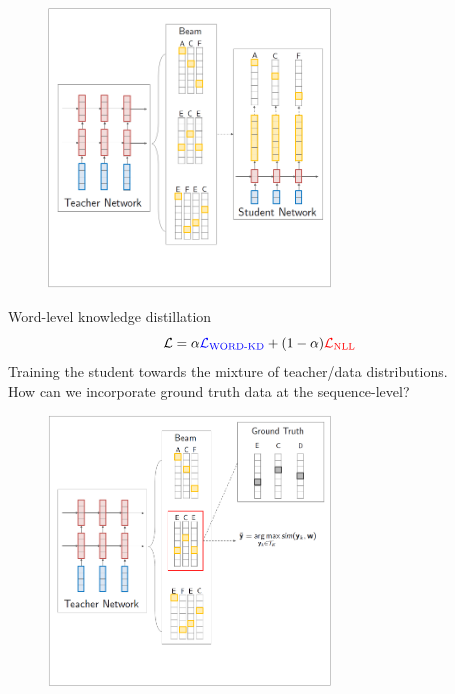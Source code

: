 \documentclass{beamer}
\newcommand{\air}{\vspace{0.25cm}}
\begin{document}
\begin{frame}
\centerline{}
\air
\air  
\begin{figure}
\center
\includegraphics[width=7.5cm]{seq-kd-2}
\end{figure}
\end{frame}

\begin{frame}
\centerline{}
\air \air \air
Word-level knowledge distillation
\[ \mathcal{L} = \alpha{\color{blue}{\mathcal{L}_{\text{WORD-KD}}}} + (1-\alpha)\color{red}{\mathcal{L}_{\text{NLL}}}\]
Training the student towards the mixture of teacher/data distributions. \\
\air \air
How can we incorporate ground truth data at the sequence-level?
\end{frame}


\begin{frame}
\centerline{}
\air \air
\begin{figure}
\center
\includegraphics[width=7.5cm]{seq-inter-0}
\end{figure}
\end{frame}
\end{document}
